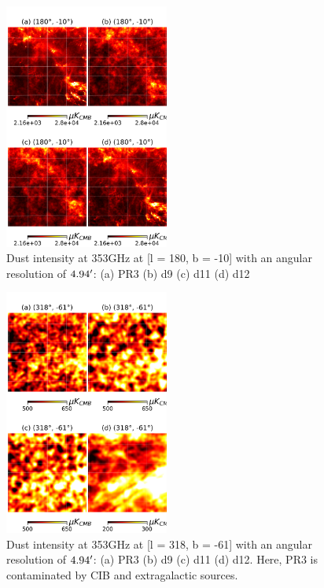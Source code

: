 \documentclass[twocolumn]{aastex631}
\begin{document}
\begin{figure}[ht!]
    \centering
    \includegraphics[width=0.48\textwidth]{figures/gal_plane_non_smooth_wo_zero_lvl.png}
\caption{Dust intensity at 353GHz at [l = 180, b = -10] with an angular resolution of $4.94\mbox{$^\prime$}$: (a) PR3 (b) d9 (c) d11 (d) d12}    
\label{fig:353_int_gal_plane}
\end{figure}
\begin{figure}[ht!]
    \centering
    \includegraphics[width=0.48\textwidth]{figures/BK_non_smooth_wo_zero_lvl.png}
    \caption{Dust intensity at 353GHz at [l = 318, b = -61] with an angular resolution of $4.94\mbox{$^\prime$}$: (a) PR3 (b) d9 (c) d11 (d) d12. Here, PR3 is contaminated by CIB and extragalactic sources.}
    \label{fig:353_int_BK}
\end{figure}
\end{document}

